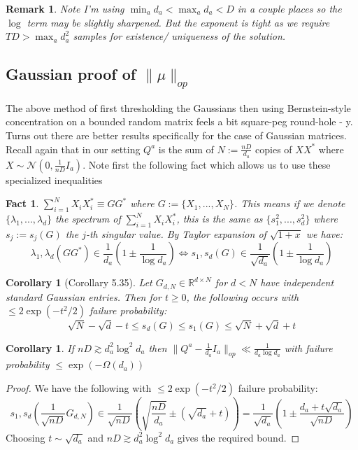 \documentclass{article}
\newtheorem{corollary}[theorem]{Corollary}
\newtheorem{fact}[theorem]{Fact}
\newtheorem{remark}{Remark}
\newcommand{\R}{{\mathbb{R}}}
\begin{document}
\begin{remark} Note I'm using $\min_{a} d_{a} < \max_{a} d_{a} < D$ in a couple places so the $\log$ term may be slightly sharpened. But the exponent is tight as we require $TD > \max_{a} d_{a}^{2}$ samples for existence/ uniqueness of the solution.
\end{remark}


\subsection{Gaussian proof of $\|\mu\|_{op}$}
The above method of first thresholding the Gaussians then using Bernstein-style concentration on a bounded random matrix feels a bit square-peg round-hole - y. Turns out there are better results specifically for the case of Gaussian matrices. Recall again that in our setting $Q^{a}$ is the sum of $N := \frac{nD}{d_{a}}$ copies of $X X^{*}$ where $X \sim \mathcal{N}(0,\frac{1}{nD} I_{a})$. Note first the following fact which allows us to use these specialized inequalities

\begin{fact}
$\sum_{i=1}^{N} X_{i} X_{i}^{*} \equiv G G^{*} $ where $G := \{X_{1}, ..., X_{N}\}$.
This means if we denote $\{\lambda_{1}, ..., \lambda_{d}\}$ the spectrum of $\sum_{i=1}^{N} X_{i} X_{i}^{*}$, this is the same as $\{s_{1}^{2}, ..., s_{d}^{2}\}$ where $s_{j} := s_{j}(G)$ the $j$-th singular value. By Taylor expansion of $\sqrt{1+x}$ we have:
\[ \lambda_{1},\lambda_{d}(GG^{*}) \in \frac{1}{d_{a}} \left( 1 \pm \frac{1}{\log d_{a}} \right) \iff s_{1},s_{d}(G) \in  \frac{1}{\sqrt{d_{a}}} \left( 1 \pm \frac{1}{\log d_{a}} \right)  \]
\end{fact}


\begin{corollary} [Corollary 5.35]%
Let $G_{d,N} \in \R^{d \times N}$ for $d < N$ have independent standard Gaussian entries. Then for $t \geq 0$, the following occurs with $\leq 2 \exp(-t^{2}/2)$ failure probability:
\[ \sqrt{N} - \sqrt{d} - t \leq s_{d}(G) \leq s_{1}(G) \leq \sqrt{N} + \sqrt{d} + t  \]
\end{corollary}

\begin{corollary}
If $nD \gtrsim d_{a}^{2} \log^{2} d_{a}$ then $\|Q^{a} - \frac{1}{d_{a}} I_{a} \|_{op} \ll \frac{1}{d_{a} \log d_{a}}$ with failure probability $\leq \exp( - \Omega(d_{a}))$
\end{corollary}
\begin{proof}
We have the following with $\leq 2 \exp(-t^{2}/2)$ failure probability:
\[ s_{1},s_{d}\left( \frac{1}{\sqrt{nD}} G_{d,N} \right) \in \frac{1}{\sqrt{nD}} \left( \sqrt{\frac{nD}{d_{a}}} \pm (\sqrt{d_{a}} + t) \right) = \frac{1}{\sqrt{d_{a}}}\left( 1 \pm \frac{d_{a} + t \sqrt{d_{a}}}{\sqrt{nD}}  \right)  \]
Choosing $t \sim \sqrt{d_{a}}$ and $nD \gtrsim d_{a}^{2} \log^{2} d_{a}$ gives the required bound.
\end{proof}
\end{document}
